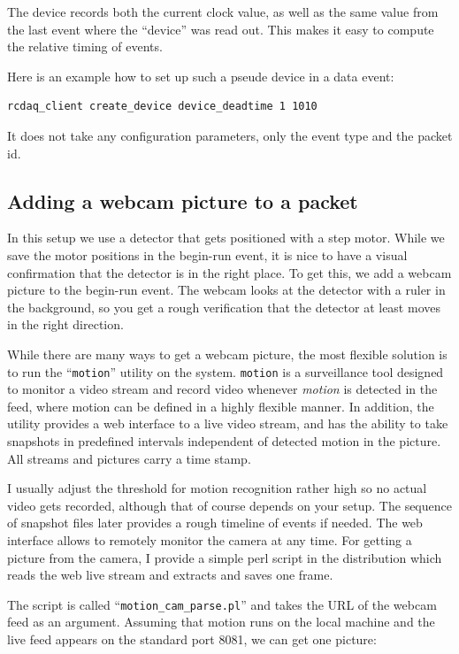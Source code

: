 \documentclass{article}[11pt]
\begin{document}
The device records both the current clock value, as well as the same
value from the last event where the ``device'' was read out. This
makes it easy to compute the relative timing of events.

Here is an example how to set up such a pseude device in a data event:

\begin{verbatim}
rcdaq_client create_device device_deadtime 1 1010
\end{verbatim}

It does not take any configuration parameters, only the event type and
the packet id.

\subsection{Adding a webcam picture to a packet}

In this setup we use a detector that gets positioned with a step
motor. While we save the motor positions in the begin-run event, it is
nice to have a visual confirmation that the detector is in the right
place. To get this, we add a webcam picture to the begin-run
event. The webcam looks at the detector with a ruler in the
background, so you get a rough verification that the detector at least
moves in the right direction.

While there are many ways to get a webcam picture, the most flexible
solution is to run the ``\verb|motion|'' utility on the
system. \verb|motion| is a surveillance tool designed to monitor a
video stream and record video whenever \emph{motion} is detected in
the feed, where motion can be defined in a highly flexible manner. In
addition, the utility provides a web interface to a live video stream,
and has the ability to take snapshots in predefined intervals
independent of detected motion in the picture. All streams and
pictures carry a time stamp.

I usually adjust the threshold for motion recognition rather high so
no actual video gets recorded, although that of course depends on your
setup. The sequence of snapshot files later provides a rough
timeline of events if needed. The web interface allows to remotely
monitor the camera at any time. For getting a picture from the camera,
I provide a simple perl script in the distribution which reads the web
live stream and extracts and saves one frame.

The script is called ``\verb|motion_cam_parse.pl|'' and takes the URL
of the webcam feed as an argument. Assuming that motion runs on the
local machine and the live feed appears on the standard port 8081, we can
get one picture:
\end{document}
